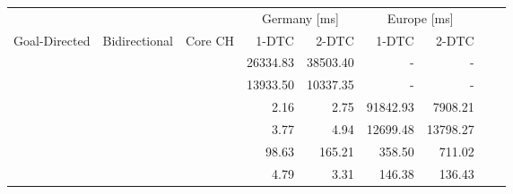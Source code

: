 \begin{tabular}{cccrrrrrr}
	\toprule
	              &               &         & \multicolumn{2}{c}{Germany [\si{\milli\second}]} & \multicolumn{2}{c}{Europe [\si{\milli\second}]}                 \\
	Goal-Directed & Bidirectional & Core CH & 1-DTC                                            & 2-DTC                                           & 1-DTC & 2-DTC \\
	\midrule
	\xmark        & \xmark        & \xmark  & 26334.83                                                & 38503.40                                               & -     & -     \\
	\xmark        & \cmark        & \xmark  & 13933.50                                                & 10337.35                                               & -     & -     \\
	\cmark        & \xmark        & \xmark  & 2.16                                                & 2.75                                               & 91842.93     & 7908.21     \\
	\cmark        & \cmark        & \xmark  & 3.77                                                & 4.94                                               & 12699.48     & 13798.27     \\
	\xmark        & \cmark        & \cmark  & 98.63                                                & 165.21                                               & 358.50     & 711.02     \\
	\cmark        & \cmark        & \cmark  & 4.79                                                & 3.31                                               & 146.38     & 136.43     \\
	\bottomrule
\end{tabular}